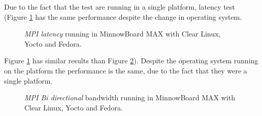Due to the fact that the test are running in a single platform, latency test (Figure
\ref{mpi_latency_yocto} has the same performance despite the change in
operating system.

\begin{figure}[H]
\begin{center}
\end{center}
\caption{\textit{MPI latency} running in  MinnowBoard MAX  with Clear Linux,
Yocto and Fedora.}
\label{mpi_latency_yocto}
\end{figure}

Figure \ref{mpi_latency_yocto} has similar results than Figure
\ref{mpi_roundtrip_yocto}). Despite the operating system running on the platform
the performance is the same, due to the fact that they were a single platform.


\begin{figure}[H]
\begin{center}
\end{center}
\caption{\textit{MPI Bi directional} bandwidth running in  MinnowBoard MAX  with Clear Linux,
Yocto and Fedora.}
\label{mpi_roundtrip_yocto}
\end{figure}

